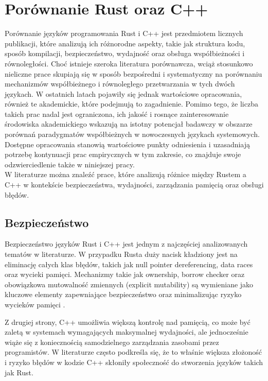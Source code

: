\section{Porównanie Rust oraz C++}
Porównanie języków programowania Rust i C++ jest przedmiotem licznych publikacji, które analizują ich różnorodne aspekty, takie jak struktura kodu, sposób kompilacji, bezpieczeństwo, wydajność oraz obsługa współbieżności i równoległości. Choć istnieje szeroka literatura porównawcza, wciąż stosunkowo nieliczne prace skupiają się w sposób bezpośredni i systematyczny na porównaniu mechanizmów współbieżnego i równoległego przetwarzania w tych dwóch językach. W ostatnich latach pojawiły się jednak wartościowe opracowania, również te akademickie, które podejmują to zagadnienie. Pomimo tego, że liczba takich prac nadal jest ograniczona, ich jakość i rosnące zainteresowanie środowiska akademickiego wskazują na istotny potencjał badawczy w obszarze porównań paradygmatów współbieżnych w nowoczesnych językach systemowych. Dostępne opracowania stanowią wartościowe punkty odniesienia i uzasadniają potrzebę kontynuacji prac empirycznych w tym zakresie, co znajduje swoje odzwierciedlenie także w niniejszej pracy. \\
W literaturze można znaleźć prace, które analizują różnice między Rustem a C++ w kontekście bezpieczeństwa, wydajności, zarządzania pamięcią oraz obsługi błędów.

\subsection{Bezpieczeństwo}
\label{Bezpieczeństwo}
Bezpieczeństwo języków Rust i C++ jest jednym z najczęściej analizowanych tematów w literaturze. W przypadku Rusta duży nacisk kładziony jest na eliminację całych klas błędów, takich jak null pointer dereferencing, data races oraz wycieki pamięci. Mechanizmy takie jak ownership, borrow checker oraz obowiązkowa mutowalność zmiennych (explicit mutability) są wymieniane jako kluczowe elementy zapewniające bezpieczeństwo oraz minimalizując ryzyko wycieków pamięci \cite{MigratingCtoRustforMemorySafety}. 

Z drugiej strony, C++ umożliwia większą kontrolę nad pamięcią, co może być zaletą w systemach wymagających maksymalnej wydajności, ale jednocześnie wiąże się z koniecznością samodzielnego zarządzania zasobami przez programistów. W literaturze \cite{RustDifferences, RustDifferences1} często podkreśla się, że to właśnie większa złożoność i ryzyko błędów w kodzie C++ skłoniły społeczność do stworzenia języków takich jak Rust.

